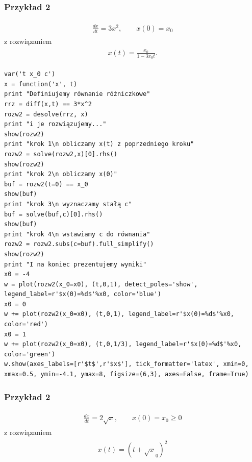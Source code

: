 \documentclass[a4paper,12pt,polish]{sphinxmanual}
\begin{document}
\subsubsection{Przykład 2}
\label{ch1/chI012:id2}\label{ch1/chI012:equation-eqn14}\begin{gather}
\begin{split}\frac{dx}{dt}= 3 x^2, \qquad x(0) = x_0\end{split}\label{ch1/chI012-eqn14}
\end{gather}
z rozwiązaniem
\label{ch1/chI012:equation-eqn15}\begin{gather}
\begin{split}x(t) = \frac{x_0}{1-3 x_0 t}.\end{split}\label{ch1/chI012-eqn15}
\end{gather}

\begin{verbatim}
var('t x_0 c')
x = function('x', t)
print "Definiujemy równanie różniczkowe"
rrz = diff(x,t) == 3*x^2
rozw2 = desolve(rrz, x)
print "i je rozwiązujemy..."
show(rozw2)
print "krok 1\n obliczamy x(t) z poprzedniego kroku"
rozw2 = solve(rozw2,x)[0].rhs()
show(rozw2)
print "krok 2\n obliczamy x(0)"
buf = rozw2(t=0) == x_0
show(buf)
print "krok 3\n wyznaczamy stałą c"
buf = solve(buf,c)[0].rhs()
show(buf)
print "krok 4\n wstawiamy c do równania"
rozw2 = rozw2.subs(c=buf).full_simplify()
show(rozw2)
print "I na koniec prezentujemy wyniki"
x0 = -4
w = plot(rozw2(x_0=x0), (t,0,1), detect_poles='show', legend_label=r'$x(0)=%d$'%x0, color='blue')
x0 = 0
w += plot(rozw2(x_0=x0), (t,0,1), legend_label=r'$x(0)=%d$'%x0, color='red')
x0 = 1
w += plot(rozw2(x_0=x0), (t,0,1/3), legend_label=r'$x(0)=%d$'%x0, color='green')
w.show(axes_labels=[r'$t$',r'$x$'], tick_formatter='latex', xmin=0, xmax=0.5, ymin=-4.1, ymax=8, figsize=(6,3), axes=False, frame=True)
\end{verbatim}



\subsubsection{Przykład 2}
\label{ch1/chI012:id3}\label{ch1/chI012:equation-eqn16}\begin{gather}
\begin{split}\frac{dx}{dt}=  2 \sqrt x, \qquad x(0) = x_0 \ge 0\end{split}\label{ch1/chI012-eqn16}
\end{gather}
z rozwiązaniem
\label{ch1/chI012:equation-eqn17}\begin{gather}
\begin{split}x(t) = (t +  \sqrt x_0)^2\end{split}\label{ch1/chI012-eqn17}
\end{gather}
\end{document}
